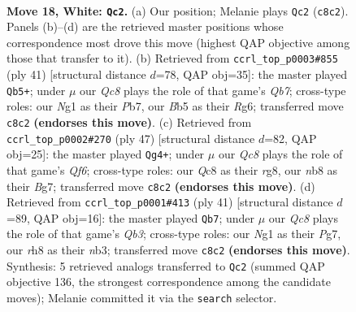 \documentclass[11pt]{article}
\begin{document}
\clearpage

\begin{figure}[p]\centering
\begin{subfigure}{0.46\textwidth}\centering
\resizebox{\linewidth}{!}{%
\newchessgame
\chessboard[
  setfen={rnQ4r/5pk1/8/pB1p3p/3Pp2q/8/PP3PP1/R3K1N1 w Q - 1 18},
  showmover=false,
  pgfstyle=straightmove, color=movearrow, markmove={c8-c2}
]}
\caption{}
\end{subfigure}\hfill
\begin{subfigure}{0.46\textwidth}\centering
\resizebox{\linewidth}{!}{%
\newchessgame
\chessboard[
  setfen={r3k3/pp3p2/6r1/7p/7P/4P3/Pq1QKPP1/R6R b q - 1 21},
  showmover=false,
  pgfstyle=straightmove, color=movearrow, markmove={b2-b5}
]}
\caption{}
\end{subfigure}
\\[4pt]
\begin{subfigure}{0.46\textwidth}\centering
\resizebox{\linewidth}{!}{%
\newchessgame
\chessboard[
  setfen={6R1/Q4pbp/2p2k2/4p3/8/2N2q2/PPPr1P1P/R5K1 b - - 2 24},
  showmover=false,
  pgfstyle=straightmove, color=movearrow, markmove={f3-g4}
]}
\caption{}
\end{subfigure}\hfill
\begin{subfigure}{0.46\textwidth}\centering
\resizebox{\linewidth}{!}{%
\newchessgame
\chessboard[
  setfen={5rk1/4bpp1/1q5p/4p3/2Q5/1N5P/1PP2PP1/5RK1 b - - 0 21},
  showmover=false,
  pgfstyle=straightmove, color=movearrow, markmove={b6-b7}
]}
\caption{}
\end{subfigure}
\caption{\textbf{Move 18, White: \texttt{Qc2}.} (a) Our position; Melanie plays \texttt{Qc2} (\texttt{c8c2}). Panels (b)--(d) are the retrieved master positions whose correspondence most drove this move (highest QAP objective among those that transfer to it). (b) Retrieved from \texttt{ccrl\_top\_p0003\#855} (ply 41) [structural distance $d$=78, QAP obj=35]: the master played \texttt{Qb5+}; under $\mu$ our \emph{Qc8} plays the role of that game's \emph{Qb7}; cross-type roles: our \emph{N}g1 as their \emph{P}b7, our \emph{B}b5 as their \emph{R}g6; transferred move \texttt{c8c2} \textbf{(endorses this move)}. (c) Retrieved from \texttt{ccrl\_top\_p0002\#270} (ply 47) [structural distance $d$=82, QAP obj=25]: the master played \texttt{Qg4+}; under $\mu$ our \emph{Qc8} plays the role of that game's \emph{Qf6}; cross-type roles: our \emph{Q}c8 as their \emph{r}g8, our \emph{n}b8 as their \emph{B}g7; transferred move \texttt{c8c2} \textbf{(endorses this move)}. (d) Retrieved from \texttt{ccrl\_top\_p0001\#413} (ply 41) [structural distance $d$=89, QAP obj=16]: the master played \texttt{Qb7}; under $\mu$ our \emph{Qc8} plays the role of that game's \emph{Qb3}; cross-type roles: our \emph{N}g1 as their \emph{P}g7, our \emph{r}h8 as their \emph{n}b3; transferred move \texttt{c8c2} \textbf{(endorses this move)}. Synthesis: 5 retrieved analogs transferred to \texttt{Qc2} (summed QAP objective 136, the strongest correspondence among the candidate moves); Melanie committed it via the \texttt{search} selector.}
\label{fig:thought-m34}
\end{figure}
\end{document}
